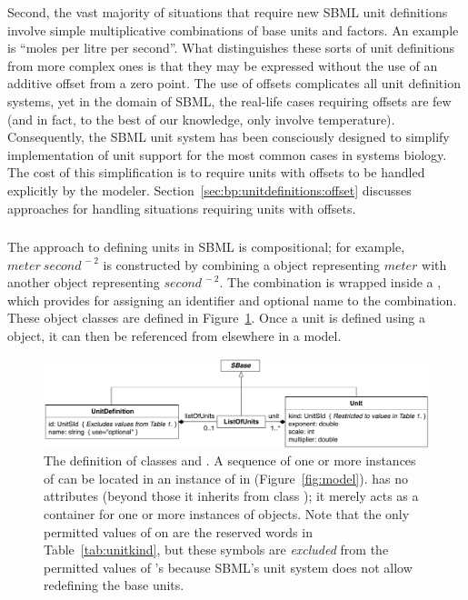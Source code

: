 Second, the vast majority of situations that require new SBML unit
definitions involve simple multiplicative combinations of base
units and factors.  An example is ``moles per litre per second''.
What distinguishes these sorts of unit definitions from more
complex ones is that they may be expressed without the use of an
additive offset from a zero point.  The use of offsets complicates
all unit definition systems, yet in the domain of SBML, the
real-life cases requiring offsets are few (and in fact, to the
best of our knowledge, only involve temperature).  Consequently,
the SBML unit system has been consciously designed to simplify
implementation of unit support for the most common cases in
systems biology.  The cost of this simplification is to require
units with offsets to be handled explicitly by the modeler.
Section~\ref{sec:bp:unitdefinitions:offset} discusses approaches
for handling situations requiring units with offsets.


\subsubsection{}
\label{sec:unitdefinition-structure}

The approach to defining units in SBML is compositional; for
example, $meter\ second^{\,-2}$ is constructed by combining a
\Unit object representing $meter$ with another \Unit object
representing $second^{\,-2}$.  The combination is wrapped inside a
\UnitDefinition, which provides for assigning an identifier and
optional name to the combination.  These object classes are
defined in Figure~\ref{fig:unitdefinition}.  Once a unit is
defined using a \UnitDefinition object, it can then be referenced
from elsewhere in a model.

\begin{figure}[htb]
  \centering
  \vspace*{1ex}
  \includegraphics[scale=0.78]{figs/unitdefinition-uml}
  \caption{The definition of classes \UnitDefinition and
      \Unit.  A sequence of one or more instances of
      \UnitDefinition can be located in an instance of
      \ListOfUnitDefinitions in \Model
      (Figure~\protect\ref{fig:model}).  \ListOfUnits has
      no attributes (beyond those it inherits from class \SBase);
      it merely acts as a container for one or more instances of
      \Unit objects.  Note that the only permitted values of
       on \Unit are the reserved words in
      Table~\vref{tab:unitkind}, but these symbols are
      \emph{excluded} from the permitted values of
      \UnitDefinition's  because SBML's unit system does
      not allow redefining the base units.}
  \label{fig:unitdefinition}
\end{figure}


